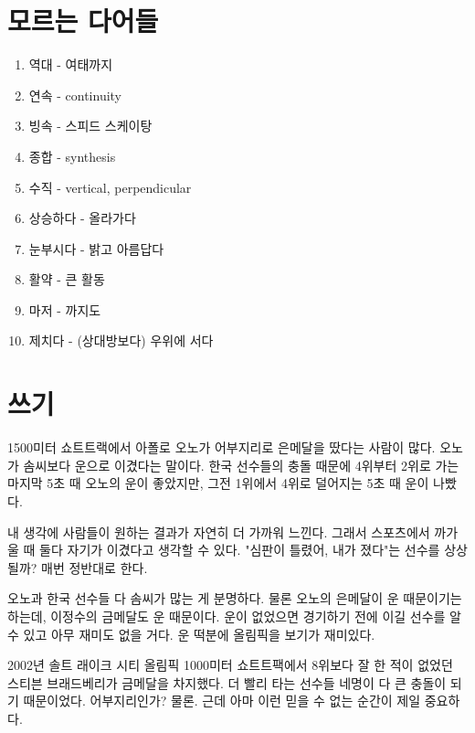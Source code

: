\documentclass[11pt]{article}
\begin{document}
\section{모르는 다어들}
\begin{enumerate}
  \item 역대 - 여태까지
  \item 연속 - continuity
  \item 빙속 - 스피드 스케이탕
  \item 종합 - synthesis
  \item 수직 - vertical, perpendicular
  \item 상승하다 - 올라가다
  \item 눈부시다 - 밝고 아름답다
  \item 활약 - 큰 활동
  \item 마저 - 까지도
  \item 제치다 - (상대방보다) 우위에 서다 
\end{enumerate}

\section{쓰기}
\doublespacing
1500미터 쇼트트랙에서 아폴로 오노가 어부지리로 은메달을 땄다는 사람이 많다.  오노가 솜씨보다 운으로 이겼다는 말이다. 한국 선수들의 충돌 때문에 4위부터 2위로 가는 마지막 5초 때 오노의 운이 좋았지만, 그전 1위에서 4위로 덜어지는 5초 때 운이 나빴다. 

내 생각에 사람들이 원하는 결과가 자연히 더 가까워 느낀다. 그래서 스포츠에서 까가울 때 둘다 자기가 이겼다고 생각할 수 있다.  "심판이 틀렸어, 내가 졌다"는 선수를 상상될까? 매번 정반대로 한다.

오노과 한국 선수들 다 솜씨가 많는 게 분명하다. 물론 오노의 은메달이 운 때문이기는 하는데, 이정수의 금메달도 운 때문이다. 운이 없었으면 경기하기 전에 이길 선수를 알 수 있고 아무 재미도 없을 거다. 운 떡분에 올림픽을 보기가 재미있다.

2002년 솔트 래이크 시티 올림픽 1000미터 쇼트트팩에서 8위보다 잘 한 적이 없었던 스티븐 브래드베리가 금메달을 차지했다. 더 빨리 타는 선수들 네명이 다 큰 충돌이 되기 때문이었다. 어부지리인가? 물론. 근데 아마 이런 믿을 수 없는 순간이 제일 중요하다.
\end{document}
